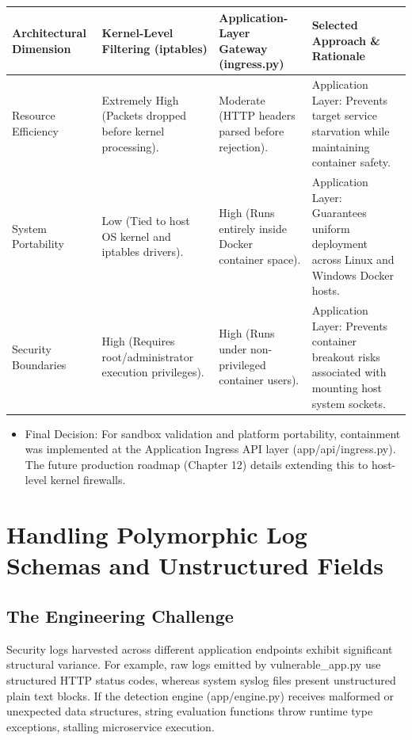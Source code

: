 \begin{table}[htbp]
\centering
\begin{tabular}{|P{3cm}|P{5cm}|P{5cm}|P{5cm}|}
\hline
Architectural Dimension & Kernel-Level Filtering (iptables) & Application-Layer Gateway (ingress.py) & Selected Approach \& Rationale \\ \hline
Resource Efficiency & Extremely High (Packets dropped before kernel processing). & Moderate (HTTP headers parsed before rejection). & Application Layer: Prevents target service starvation while maintaining container safety. \\ \hline
System Portability & Low (Tied to host OS kernel and iptables drivers). & High (Runs entirely inside Docker container space). & Application Layer: Guarantees uniform deployment across Linux and Windows Docker hosts. \\ \hline
Security Boundaries & High (Requires root/administrator execution privileges). & High (Runs under non-privileged container users). & Application Layer: Prevents container breakout risks associated with mounting host system sockets. \\ \hline
\end{tabular}
\end{table}

\begin{itemize}
  \item Final Decision: For sandbox validation and platform portability, containment was implemented at the Application Ingress API layer (app/api/ingress.py). The future production roadmap (Chapter 12) details extending this to host-level kernel firewalls.
\end{itemize}

\section{Handling Polymorphic Log Schemas and Unstructured Fields}

\subsection{The Engineering Challenge}

Security logs harvested across different application endpoints exhibit significant structural variance. For example, raw logs emitted by vulnerable\_app.py use structured HTTP status codes, whereas system syslog files present unstructured plain text blocks. If the detection engine (app/engine.py) receives malformed or unexpected data structures, string evaluation functions throw runtime type exceptions, stalling microservice execution.

